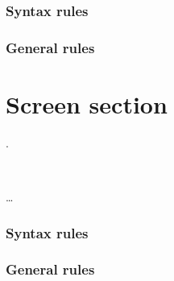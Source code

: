 \subsubsection{Syntax rules}

\subsubsection{General rules}

\section{Screen section}
\begin{syntax}
   .\newline
  \begin{0-1}
     \\
  \end{0-1}\ldots
\end{syntax}

\subsubsection{Syntax rules}

\subsubsection{General rules}

